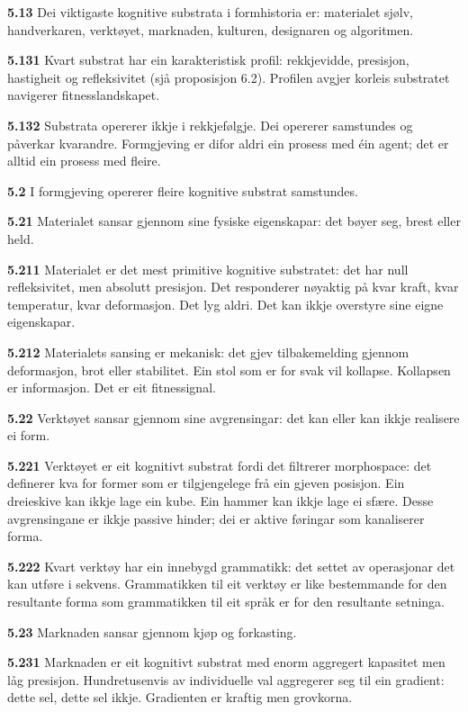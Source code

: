 \documentclass[11pt, a4paper]{article}
\newcommand{\subprop}[1]{\medskip\noindent\textbf{#1}\quad}
\begin{document}
\subprop{5.13} Dei viktigaste kognitive substrata i formhistoria er: materialet sj\o lv, handverkaren, verkt\o yet, marknaden, kulturen, designaren og algoritmen.

\subprop{5.131} Kvart substrat har ein karakteristisk profil: rekkjevidde, presisjon, hastigheit og refleksivitet (sj\aa{} proposisjon 6.2). Profilen avgjer korleis substratet navigerer fitnesslandskapet.

\subprop{5.132} Substrata opererer ikkje i rekkjef\o lgje. Dei opererer samstundes og p\aa verkar kvarandre. Formgjeving er difor aldri ein prosess med \'ein agent; det er alltid ein prosess med fleire.

\subprop{5.2} I formgjeving opererer fleire kognitive substrat samstundes.

\subprop{5.21} Materialet sansar gjennom sine fysiske eigenskapar: det b\o yer seg, brest eller held.

\subprop{5.211} Materialet er det mest primitive kognitive substratet: det har null refleksivitet, men absolutt presisjon. Det responderer n\o yaktig p\aa{} kvar kraft, kvar temperatur, kvar deformasjon. Det lyg aldri. Det kan ikkje overstyre sine eigne eigenskapar.

\subprop{5.212} Materialets sansing er mekanisk: det gjev tilbakemelding gjennom deformasjon, brot eller stabilitet. Ein stol som er for svak vil kollapse. Kollapsen er informasjon. Det er eit fitnessignal.

\subprop{5.22} Verkt\o yet sansar gjennom sine avgrensingar: det kan eller kan ikkje realisere ei form.

\subprop{5.221} Verkt\o yet er eit kognitivt substrat fordi det filtrerer morphospace: det definerer kva for former som er tilgjengelege fr\aa{} ein gjeven posisjon. Ein dreieskive kan ikkje lage ein kube. Ein hammer kan ikkje lage ei sf\ae re. Desse avgrensingane er ikkje passive hinder; dei er aktive f\o ringar som kanaliserer forma.

\subprop{5.222} Kvart verkt\o y har ein innebygd grammatikk: det settet av operasjonar det kan utf\o re i sekvens. Grammatikken til eit verkt\o y er like bestemmande for den resultante forma som grammatikken til eit spr\aa k er for den resultante setninga.

\subprop{5.23} Marknaden sansar gjennom kj\o p og forkasting.

\subprop{5.231} Marknaden er eit kognitivt substrat med enorm aggregert kapasitet men l\aa g presisjon. Hundretusenvis av individuelle val aggregerer seg til ein gradient: dette sel, dette sel ikkje. Gradienten er kraftig men grovkorna.
\end{document}
